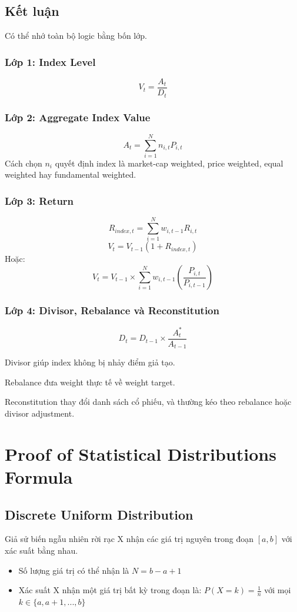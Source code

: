 \section{Kết luận}
\label{sec:app_index_conclusion}
Có thể nhớ toàn bộ logic bằng bốn lớp.
\subsection*{Lớp 1: Index Level}
\[
V_t
=
\frac{A_t}{D_t}
\]

\subsection*{Lớp 2: Aggregate Index Value}
\[
A_t
=
\sum_{i=1}^{N}n_{i,t}P_{i,t}
\]
Cách chọn \(n_i\) quyết định index là market-cap weighted, price weighted, equal weighted hay fundamental weighted.

\subsection*{Lớp 3: Return}
\[
R_{index,t}
=
\sum_{i=1}^{N}w_{i,t-1}R_{i,t}
\]
\[
V_t
=
V_{t-1}(1+R_{index,t})
\]
Hoặc:
\[
V_t
=
V_{t-1}
\times
\sum_{i=1}^{N}
w_{i,t-1}
\left(
\frac{P_{i,t}}{P_{i,t-1}}
\right)
\]

\subsection*{Lớp 4: Divisor, Rebalance và Reconstitution}
\[
D_t
=
D_{t-1}
\times
\frac{A_t^*}{A_{t-1}}
\]

Divisor giúp index không bị nhảy điểm giả tạo.

Rebalance đưa weight thực tế về weight target.

Reconstitution thay đổi danh sách cổ phiếu, và thường kéo theo rebalance hoặc divisor adjustment.

\chapter{Proof of Statistical Distributions Formula}
\label{chap:Proof of Statistical Distributions Formula}

\section{Discrete Uniform Distribution}
\label{sec:Proof_Discrete_Uniform}
Giả sử biến ngẫu nhiên rời rạc X nhận các giá trị nguyên trong đoạn $[a, b]$ với xác suất bằng nhau.
\begin{itemize}
	\item Số lượng giá trị có thể nhận là $N = b - a + 1$
	\item Xác suất X nhận một giá trị bất kỳ trong đoạn là: $P(X=k)=\frac{1}{n}$ với mọi $k \in \{a, a+1,..., b\}$ 
\end{itemize}

